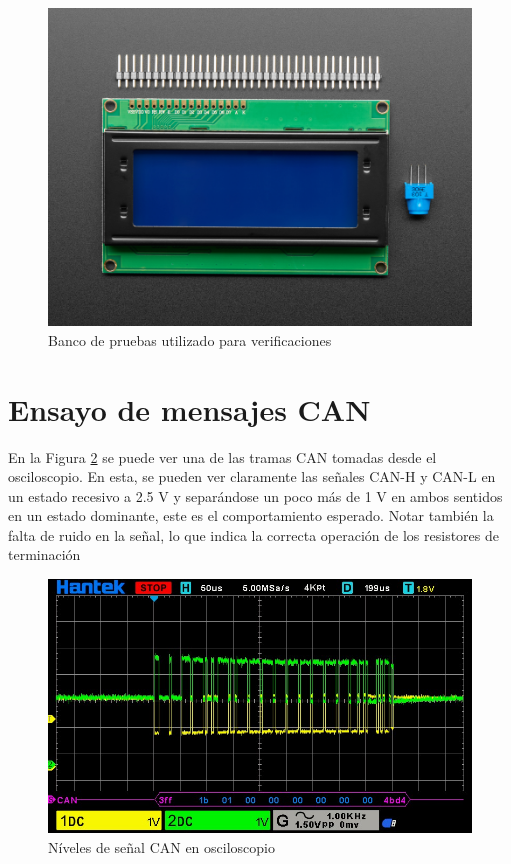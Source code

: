 \begin{figure}[htbp]
	\centering
	\includegraphics[scale=1]{./Figures/LCD.jpg}
	\caption{Banco de pruebas utilizado para verificaciones}
	\label{fig:Banco}
\end{figure}



\section{Ensayo de mensajes CAN}

En la Figura \ref{fig:niv_señal} se puede ver una de las tramas CAN tomadas desde el osciloscopio. En esta, se pueden ver claramente las señales CAN-H y CAN-L en un estado recesivo a 2.5 V y separándose un poco más de 1 V en ambos sentidos en un estado dominante, este es el comportamiento esperado. Notar también la falta de ruido en la señal, lo que indica la correcta operación de los resistores de terminación

\begin{figure}[htbp]
	\centering
	\includegraphics[scale=0.6]{./Figures/Message_Change_Operation_Mode_CONFIG.jpg}
	\caption{Níveles de señal CAN en osciloscopio}
	\label{fig:niv_señal}
\end{figure}

